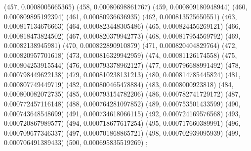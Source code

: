 {					(457, 0.0008005665365)
					(458, 0.00080698861767)
					(459, 0.000809180948944)
					(460, 0.000809895192394)
					(461, 0.00080936636935)
					(462, 0.000813525650551)
					(463, 0.000817134676663)
					(464, 0.000823448305486)
					(465, 0.000824456269121)
					(466, 0.000818473824502)
					(467, 0.000820379942773)
					(468, 0.000817954569792)
					(469, 0.00082138945981)
					(470, 0.000822890910879)
					(471, 0.000820404829764)
					(472, 0.000820957701618)
					(473, 0.000816329942959)
					(474, 0.00081126174558)
					(475, 0.000804253915544)
					(476, 0.000793378962127)
					(477, 0.000796688991492)
					(478, 0.000798449622138)
					(479, 0.000810238131213)
					(480, 0.000814785445824)
					(481, 0.000807749449719)
					(482, 0.000800465478884)
					(483, 0.0008000923818)
					(484, 0.000800082072735)
					(485, 0.000793154782206)
					(486, 0.000782741729172)
					(487, 0.000772457116148)
					(488, 0.000764281097852)
					(489, 0.000753501433599)
					(490, 0.000743648548699)
					(491, 0.000734618066115)
					(492, 0.000724169576568)
					(493, 0.000720867989577)
					(494, 0.000718677617254)
					(495, 0.000717660389991)
					(496, 0.000709677346337)
					(497, 0.000701868865721)
					(498, 0.000702939095939)
					(499, 0.000706491389433)
					(500, 0.000695835519269)
				};
